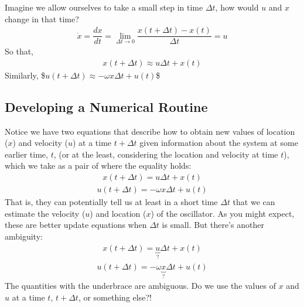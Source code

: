 \documentclass[letterpaper,10pt,english]{jupyterBook}
\begin{document}
\sphinxAtStartPar
Imagine we allow ourselves to take a small step in time \(\Delta t\), how would \(u\) and \(x\) change in that time?
\begin{equation*}
\begin{split}\dot{x} = \dfrac{dx}{dt} = \lim_{\Delta t \rightarrow 0} \dfrac{x(t+\Delta t) - x(t)}{\Delta t} = u\end{split}
\end{equation*}
\sphinxAtStartPar
So that,
\begin{equation*}
\begin{split}x(t+\Delta t) \approx u\Delta t + x(t)\end{split}
\end{equation*}
\sphinxAtStartPar
Similarly,
\$\(u(t+\Delta t) \approx -\omega x \Delta t + u(t)\)\$


\subsection{Developing a Numerical Routine}
\label{\detokenize{content/1_modeling/SHO-numerical:developing-a-numerical-routine}}
\sphinxAtStartPar
Notice we have two equations that describe how to obtain new values of location (\(x\)) and velocity (\(u\)) at a time \(t+\Delta t\) given information about the system at some earlier time, \(t\), (or at the least, considering the location and velocity at time \(t\)), which we take as a pair of  where the equality holds:
\begin{equation*}
\begin{split}x(t+\Delta t) = u\Delta t + x(t)\end{split}
\end{equation*}\begin{equation*}
\begin{split}u(t+\Delta t) = -\omega x \Delta t + u(t)\end{split}
\end{equation*}
\sphinxAtStartPar
That is, they can potentially tell us at least in a short time \(\Delta t\) that we can estimate the velocity (\(u\)) and location (\(x\)) of the oscillator.  As you might expect, these are better update equations when \(\Delta t\) is small. But there’s another ambiguity:
\begin{equation*}
\begin{split}x(t+\Delta t) = \underbrace{u}_{\mathtt{?}}\Delta t + x(t)\end{split}
\end{equation*}\begin{equation*}
\begin{split}u(t+\Delta t) = -\omega \underbrace{x}_{\mathtt{?}} \Delta t + u(t)\end{split}
\end{equation*}
\sphinxAtStartPar
The quantities with the underbrace are ambiguous. Do we use the values of \(x\) and \(u\) at a time \(t\), \(t+\Delta t\), or something else?!
\end{document}
